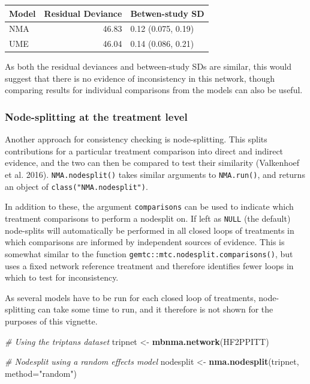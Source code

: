 \documentclass[]{article}
\newenvironment{Shaded}{\begin{snugshade}}{\end{snugshade}}
\newcommand{\CommentTok}[1]{\textcolor[rgb]{0.56,0.35,0.01}{\textit{#1}}}
\newcommand{\DataTypeTok}[1]{\textcolor[rgb]{0.13,0.29,0.53}{#1}}
\newcommand{\KeywordTok}[1]{\textcolor[rgb]{0.13,0.29,0.53}{\textbf{#1}}}
\newcommand{\NormalTok}[1]{#1}
\newcommand{\StringTok}[1]{\textcolor[rgb]{0.31,0.60,0.02}{#1}}
\begin{document}
\begin{longtable}[]{@{}lrl@{}}
\toprule
Model & Residual Deviance & Betwen-study SD\tabularnewline
\midrule
\endhead
NMA & 46.83 & 0.12 (0.075, 0.19)\tabularnewline
UME & 46.04 & 0.14 (0.086, 0.21)\tabularnewline
\bottomrule
\end{longtable}

As both the residual deviances and between-study SDs are similar, this
would suggest that there is no evidence of inconsistency in this
network, though comparing results for individual comparisons from the
models can also be useful.

\hypertarget{node-splitting-at-the-treatment-level}{%
\subsubsection{Node-splitting at the treatment
level}\label{node-splitting-at-the-treatment-level}}

Another approach for consistency checking is node-splitting. This splits
contributions for a particular treatment comparison into direct and
indirect evidence, and the two can then be compared to test their
similarity (Valkenhoef et al. 2016). \texttt{NMA.nodesplit()} takes
similar arguments to \texttt{NMA.run()}, and returns an object of
\texttt{class("NMA.nodesplit")}.

In addition to these, the argument \texttt{comparisons} can be used to
indicate which treatment comparisons to perform a nodesplit on. If left
as \texttt{NULL} (the default) node-splits will automatically be
performed in all closed loops of treatments in which comparisons are
informed by independent sources of evidence. This is somewhat similar to
the function \texttt{gemtc::mtc.nodesplit.comparisons()}, but uses a
fixed network reference treatment and therefore identifies fewer loops
in which to test for inconsistency.

As several models have to be run for each closed loop of treatments,
node-splitting can take some time to run, and it therefore is not shown
for the purposes of this vignette.

\begin{Shaded}
\begin{Highlighting}[]
\CommentTok{# Using the triptans dataset}
\NormalTok{tripnet <-}\StringTok{ }\KeywordTok{mbnma.network}\NormalTok{(HF2PPITT)}

\CommentTok{# Nodesplit using a random effects model}
\NormalTok{nodesplit <-}\StringTok{ }\KeywordTok{nma.nodesplit}\NormalTok{(tripnet, }\DataTypeTok{method=}\StringTok{"random"}\NormalTok{)}
\end{Highlighting}
\end{Shaded}
\end{document}
